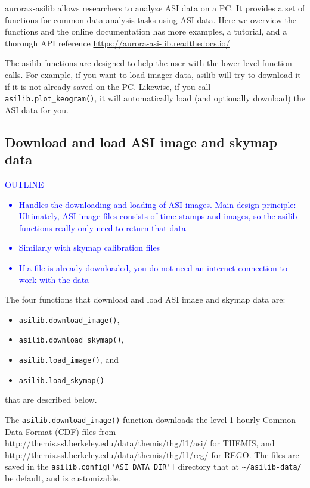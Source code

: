 \documentclass[draft]{agujournal2019}
\begin{document}
aurorax-asilib allows researchers to analyze ASI data on a PC. It provides a set of functions for common data analysis tasks using ASI data. Here we overview the functions and the online documentation has more examples, a tutorial, and a thorough API reference \url{https://aurora-asi-lib.readthedocs.io/}

The asilib functions are designed to help the user with the lower-level function calls. For example, if you want to load imager data, asilib will try to download it if it is not already saved on the PC. Likewise, if you call \verb|asilib.plot_keogram()|, it will automatically load (and optionally download) the ASI data for you.

\subsection{Download and load ASI image and skymap data}
\textcolor{blue}{
      OUTLINE
      \begin{itemize}
            \item Handles the downloading and loading of ASI images. Main design principle: Ultimately, ASI image files consists of time stamps and images, so the asilib functions really only need to return that data
            \item Similarly with skymap calibration files
            \item If a file is already downloaded, you do not need an internet connection to work with the data
      \end{itemize}
}

The four functions that download and load ASI image and skymap data are: 

\begin{itemize}
      \item \verb|asilib.download_image()|,
      \item \verb|asilib.download_skymap()|,
      \item \verb|asilib.load_image()|, and
      \item \verb|asilib.load_skymap()|
\end{itemize} that are described below.

The \verb|asilib.download_image()| function downloads the level 1 hourly Common Data Format (CDF) files from \url{http://themis.ssl.berkeley.edu/data/themis/thg/l1/asi/} for THEMIS, and \url{http://themis.ssl.berkeley.edu/data/themis/thg/l1/reg/} for REGO. The files are saved in the \verb|asilib.config['ASI_DATA_DIR']| directory that at \verb|~/asilib-data/| be default, and is customizable.
\end{document}
